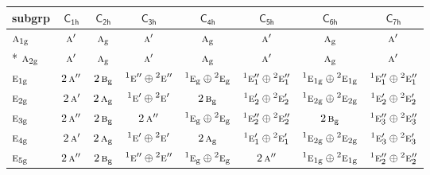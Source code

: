 \documentclass[10pt,a4paper]{article}
\numberwithin{equation}{section}
\newcommand{\grp}[1]{\mathsf{#1}}
\newcommand{\irr}[1]{\text{\normalfont\scshape #1}}
\newcommand{\conjpair}[1]{{}^{#1}}
\newcommand{\ptag}[1]{\mathrm{#1}}
\begin{document}
{\small\begin{longtable}{@{}lccccccc@{}}\toprule
subgrp & \href{C1h.pdf}{$\grp{C_{1h}}$} & \href{C2h.pdf}{$\grp{C_{2h}}$} & \href{C3h.pdf}{$\grp{C_{3h}}$} & \href{C4h.pdf}{$\grp{C_{4h}}$} & \href{C5h.pdf}{$\grp{C_{5h}}$} & \href{C6h.pdf}{$\grp{C_{6h}}$} & \href{C7h.pdf}{$\grp{C_{7h}}$}\\\midrule\endhead
\bottomrule\endfoot\endlastfoot
$\irr{a}_{1\ptag{g}}$ & $\irr{a}'$ & $\irr{a}_{\ptag{g}}$ & $\irr{a}'$ & $\irr{a}_{\ptag{g}}$ & $\irr{a}'$ & $\irr{a}_{\ptag{g}}$ & $\irr{a}'$\\*
$\irr{a}_{2\ptag{g}}$ & $\irr{a}'$ & $\irr{a}_{\ptag{g}}$ & $\irr{a}'$ & $\irr{a}_{\ptag{g}}$ & $\irr{a}'$ & $\irr{a}_{\ptag{g}}$ & $\irr{a}'$\\
$\irr{e}_{1\ptag{g}}$ & $2\,\irr{a}''$ & $2\,\irr{b}_{\ptag{g}}$ & $\conjpair{1}\irr{e}''\oplus \conjpair{2}\irr{e}''$ & $\conjpair{1}\irr{e}_{\ptag{g}}\oplus \conjpair{2}\irr{e}_{\ptag{g}}$ & $\conjpair{1}\irr{e}_{1}''\oplus \conjpair{2}\irr{e}_{1}''$ & $\conjpair{1}\irr{e}_{1\ptag{g}}\oplus \conjpair{2}\irr{e}_{1\ptag{g}}$ & $\conjpair{1}\irr{e}_{1}''\oplus \conjpair{2}\irr{e}_{1}''$\\
$\irr{e}_{2\ptag{g}}$ & $2\,\irr{a}'$ & $2\,\irr{a}_{\ptag{g}}$ & $\conjpair{1}\irr{e}'\oplus \conjpair{2}\irr{e}'$ & $2\,\irr{b}_{\ptag{g}}$ & $\conjpair{1}\irr{e}_{2}'\oplus \conjpair{2}\irr{e}_{2}'$ & $\conjpair{1}\irr{e}_{2\ptag{g}}\oplus \conjpair{2}\irr{e}_{2\ptag{g}}$ & $\conjpair{1}\irr{e}_{2}'\oplus \conjpair{2}\irr{e}_{2}'$\\
$\irr{e}_{3\ptag{g}}$ & $2\,\irr{a}''$ & $2\,\irr{b}_{\ptag{g}}$ & $2\,\irr{a}''$ & $\conjpair{1}\irr{e}_{\ptag{g}}\oplus \conjpair{2}\irr{e}_{\ptag{g}}$ & $\conjpair{1}\irr{e}_{2}''\oplus \conjpair{2}\irr{e}_{2}''$ & $2\,\irr{b}_{\ptag{g}}$ & $\conjpair{1}\irr{e}_{3}''\oplus \conjpair{2}\irr{e}_{3}''$\\
$\irr{e}_{4\ptag{g}}$ & $2\,\irr{a}'$ & $2\,\irr{a}_{\ptag{g}}$ & $\conjpair{1}\irr{e}'\oplus \conjpair{2}\irr{e}'$ & $2\,\irr{a}_{\ptag{g}}$ & $\conjpair{1}\irr{e}_{1}'\oplus \conjpair{2}\irr{e}_{1}'$ & $\conjpair{1}\irr{e}_{2\ptag{g}}\oplus \conjpair{2}\irr{e}_{2\ptag{g}}$ & $\conjpair{1}\irr{e}_{3}'\oplus \conjpair{2}\irr{e}_{3}'$\\
$\irr{e}_{5\ptag{g}}$ & $2\,\irr{a}''$ & $2\,\irr{b}_{\ptag{g}}$ & $\conjpair{1}\irr{e}''\oplus \conjpair{2}\irr{e}''$ & $\conjpair{1}\irr{e}_{\ptag{g}}\oplus \conjpair{2}\irr{e}_{\ptag{g}}$ & $2\,\irr{a}''$ & $\conjpair{1}\irr{e}_{1\ptag{g}}\oplus \conjpair{2}\irr{e}_{1\ptag{g}}$ & $\conjpair{1}\irr{e}_{2}''\oplus \conjpair{2}\irr{e}_{2}''$\\

\end{longtable}}
\end{document}
